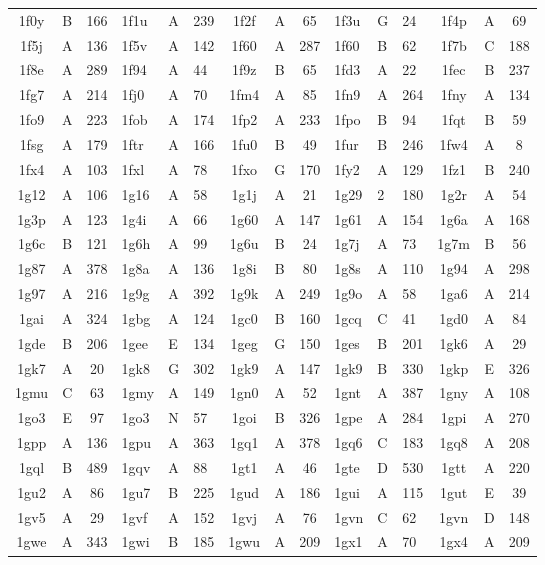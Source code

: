 \begin{longtable}{|c|c|c| a|a|a| c|c|c| a|a|a| c|c|c|}
1f0y & B & 166 & 1f1u & A & 239 & 1f2f & A & 65 & 1f3u & G & 24 & 1f4p & A & 69\\
1f5j & A & 136 & 1f5v & A & 142 & 1f60 & A & 287 & 1f60 & B & 62 & 1f7b & C & 188\\
1f8e & A & 289 & 1f94 & A & 44 & 1f9z & B & 65 & 1fd3 & A & 22 & 1fec & B & 237\\
1fg7 & A & 214 & 1fj0 & A & 70 & 1fm4 & A & 85 & 1fn9 & A & 264 & 1fny & A & 134\\
1fo9 & A & 223 & 1fob & A & 174 & 1fp2 & A & 233 & 1fpo & B & 94 & 1fqt & B & 59\\
1fsg & A & 179 & 1ftr & A & 166 & 1fu0 & B & 49 & 1fur & B & 246 & 1fw4 & A & 8\\
1fx4 & A & 103 & 1fxl & A & 78 & 1fxo & G & 170 & 1fy2 & A & 129 & 1fz1 & B & 240\\
1g12 & A & 106 & 1g16 & A & 58 & 1g1j & A & 21 & 1g29 & 2 & 180 & 1g2r & A & 54\\
1g3p & A & 123 & 1g4i & A & 66 & 1g60 & A & 147 & 1g61 & A & 154 & 1g6a & A & 168\\
1g6c & B & 121 & 1g6h & A & 99 & 1g6u & B & 24 & 1g7j & A & 73 & 1g7m & B & 56\\
1g87 & A & 378 & 1g8a & A & 136 & 1g8i & B & 80 & 1g8s & A & 110 & 1g94 & A & 298\\
1g97 & A & 216 & 1g9g & A & 392 & 1g9k & A & 249 & 1g9o & A & 58 & 1ga6 & A & 214\\
1gai & A & 324 & 1gbg & A & 124 & 1gc0 & B & 160 & 1gcq & C & 41 & 1gd0 & A & 84\\
1gde & B & 206 & 1gee & E & 134 & 1geg & G & 150 & 1ges & B & 201 & 1gk6 & A & 29\\
1gk7 & A & 20 & 1gk8 & G & 302 & 1gk9 & A & 147 & 1gk9 & B & 330 & 1gkp & E & 326\\
1gmu & C & 63 & 1gmy & A & 149 & 1gn0 & A & 52 & 1gnt & A & 387 & 1gny & A & 108\\
1go3 & E & 97 & 1go3 & N & 57 & 1goi & B & 326 & 1gpe & A & 284 & 1gpi & A & 270\\
1gpp & A & 136 & 1gpu & A & 363 & 1gq1 & A & 378 & 1gq6 & C & 183 & 1gq8 & A & 208\\
1gql & B & 489 & 1gqv & A & 88 & 1gt1 & A & 46 & 1gte & D & 530 & 1gtt & A & 220\\
1gu2 & A & 86 & 1gu7 & B & 225 & 1gud & A & 186 & 1gui & A & 115 & 1gut & E & 39\\
1gv5 & A & 29 & 1gvf & A & 152 & 1gvj & A & 76 & 1gvn & C & 62 & 1gvn & D & 148\\
1gwe & A & 343 & 1gwi & B & 185 & 1gwu & A & 209 & 1gx1 & A & 70 & 1gx4 & A & 209\\

\end{longtable}
